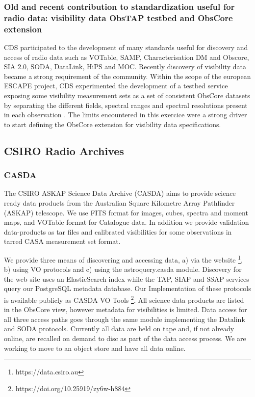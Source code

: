 \documentclass[11pt,a4paper]{ivoatex/ivoa}
\begin{document}
\subsubsection{Old and recent contribution to standardization useful for radio data: visibility data ObsTAP testbed and ObsCore extension }

CDS participated to the development of many standards useful for discovery and access of radio data such as VOTable, SAMP, Characterisation DM and Obscore, SIA 2.0, SODA, DataLink, HiPS and MOC. 
Recently discovery of visibility data became a strong requirement of the community. Within the scope of the european ESCAPE project, CDS experimented the development of a testbed service exposing some visibility measurement sets as a set of consistent ObsCore datasets by separating the different fields, spectral ranges and spectral resolutions present in each observation \citep{2020arXiv201209273L}. The limits encountered in this exercice were a strong driver to start defining the ObsCore extension for  visibility data specifications.


\subsection{CSIRO Radio Archives}\label{sec:CASDA}

\subsubsection{CASDA}

The CSIRO ASKAP Science Data Archive (CASDA) aims to provide science ready data products from the Australian Square Kilometre Array Pathfinder (ASKAP) telescope. 
We use FITS format for images, cubes, spectra and moment maps, and VOTable format for Catalogue data. 
In addition we provide validation data-products as tar files and calibrated visibilities for some observations in tarred CASA measurement set format.

We provide three means of discovering and accessing data, a) via the website \footnote{https://data.csiro.au}, b) using VO protocols and c) using the astroquery.casda module. 
Discovery for the web site uses an ElasticSearch index while the TAP, SIAP and SSAP services query our PostgreSQL metadata database. 
Our Implementation of these protocols is available publicly as CASDA VO Tools \footnote{https://doi.org/10.25919/zy6w-h884}.
All science data products are listed in the ObsCore view, however metadata for visibilities is limited. 
Data access for all three access paths goes through the same module implementing the Datalink and SODA protocols. 
Currently all data are held on tape and, if not already online, are recalled on demand to disc as part of the data access process. 
We are working to move to an object store and have all data online.
\end{document}
